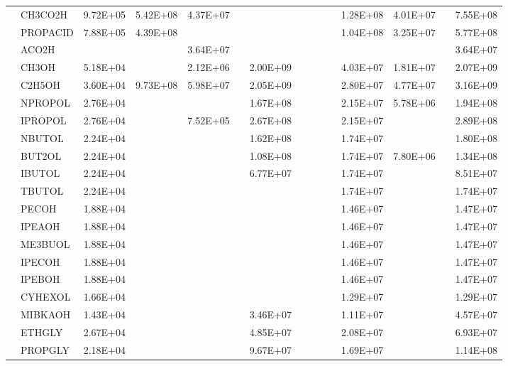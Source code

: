 \begin{longtable}{lllllllllllllll}
	 & CH3CO2H & 9.72E+05 & 5.42E+08 & 4.37E+07 &  &  &  &  &  &  & 1.28E+08 & 4.01E+07 &  & 7.55E+08 \\
	 & PROPACID & 7.88E+05 & 4.39E+08 &  &  &  &  &  &  &  & 1.04E+08 & 3.25E+07 &  & 5.77E+08 \\
	 & ACO2H &  &  & 3.64E+07 &  &  &  &  &  &  &  &  &  & 3.64E+07 \\
	\hline \parbox[t]{2mm}{} & CH3OH & 5.18E+04 &  & 2.12E+06 &  & 2.00E+09 &  &  &  &  & 4.03E+07 & 1.81E+07 &  & 2.07E+09 \\*
	 & C2H5OH & 3.60E+04 & 9.73E+08 & 5.98E+07 &  & 2.05E+09 &  &  &  &  & 2.80E+07 & 4.77E+07 &  & 3.16E+09 \\*
	 & NPROPOL & 2.76E+04 &  &  &  & 1.67E+08 &  &  &  &  & 2.15E+07 & 5.78E+06 &  & 1.94E+08 \\*
	 & IPROPOL & 2.76E+04 &  & 7.52E+05 &  & 2.67E+08 &  &  &  &  & 2.15E+07 &  &  & 2.89E+08 \\*
	 & NBUTOL & 2.24E+04 &  &  &  & 1.62E+08 &  &  &  &  & 1.74E+07 &  &  & 1.80E+08 \\
	 & BUT2OL & 2.24E+04 &  &  &  & 1.08E+08 &  &  &  &  & 1.74E+07 & 7.80E+06 &  & 1.34E+08 \\
	 & IBUTOL & 2.24E+04 &  &  &  & 6.77E+07 &  &  &  &  & 1.74E+07 &  &  & 8.51E+07 \\
	 & TBUTOL & 2.24E+04 &  &  &  &  &  &  &  &  & 1.74E+07 &  &  & 1.74E+07 \\
	 & PECOH & 1.88E+04 &  &  &  &  &  &  &  &  & 1.46E+07 &  &  & 1.47E+07 \\
	 & IPEAOH & 1.88E+04 &  &  &  &  &  &  &  &  & 1.46E+07 &  &  & 1.47E+07 \\
	 & ME3BUOL & 1.88E+04 &  &  &  &  &  &  &  &  & 1.46E+07 &  &  & 1.47E+07 \\
	 & IPECOH & 1.88E+04 &  &  &  &  &  &  &  &  & 1.46E+07 &  &  & 1.47E+07 \\
	 & IPEBOH & 1.88E+04 &  &  &  &  &  &  &  &  & 1.46E+07 &  &  & 1.47E+07 \\
	 & CYHEXOL & 1.66E+04 &  &  &  &  &  &  &  &  & 1.29E+07 &  &  & 1.29E+07 \\
	 & MIBKAOH & 1.43E+04 &  &  &  & 3.46E+07 &  &  &  &  & 1.11E+07 &  &  & 4.57E+07 \\
	 & ETHGLY & 2.67E+04 &  &  &  & 4.85E+07 &  &  &  &  & 2.08E+07 &  &  & 6.93E+07 \\
	 & PROPGLY & 2.18E+04 &  &  &  & 9.67E+07 &  &  &  &  & 1.69E+07 &  &  & 1.14E+08 \\

\end{longtable}
